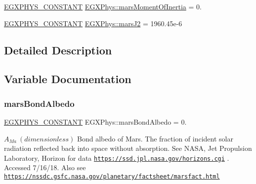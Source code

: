 \begin{DoxyCompactItemize}
\mbox{\hyperlink{group___e_g_x_phys-_constants-_macros_ga76980d288494ce1714c9ac68a95ba702}{E\+G\+X\+P\+H\+Y\+S\+\_\+\+C\+O\+N\+S\+T\+A\+NT}} \mbox{\hyperlink{group___e_g_x_phys-_constants-_astrophysics-_solar_system-_mars-_bulk_ga0401a539ddc5ee19e1b9d031a2257b98}{E\+G\+X\+Phys\+::mars\+Moment\+Of\+Inertia}} = 0.
\item 
\mbox{\hyperlink{group___e_g_x_phys-_constants-_macros_ga76980d288494ce1714c9ac68a95ba702}{E\+G\+X\+P\+H\+Y\+S\+\_\+\+C\+O\+N\+S\+T\+A\+NT}} \mbox{\hyperlink{group___e_g_x_phys-_constants-_astrophysics-_solar_system-_mars-_bulk_ga28d6e310ea5b1ef018ad79d49a95350f}{E\+G\+X\+Phys\+::mars\+J2}} = 1960.\+45e-\/6
\end{DoxyCompactItemize}


\subsection{Detailed Description}


\subsection{Variable Documentation}
\mbox{\label{group___e_g_x_phys-_constants-_astrophysics-_solar_system-_mars-_bulk_ga9e8ddb7e6501c2426bc750822807259c}} 
\subsubsection{\texorpdfstring{mars\+Bond\+Albedo}{marsBondAlbedo}}
{\footnotesize\ttfamily \mbox{\hyperlink{group___e_g_x_phys-_constants-_macros_ga76980d288494ce1714c9ac68a95ba702}{E\+G\+X\+P\+H\+Y\+S\+\_\+\+C\+O\+N\+S\+T\+A\+NT}} E\+G\+X\+Phys\+::mars\+Bond\+Albedo = 0.}

$ A_{Ma} \ (dimensionless)$ Bond albedo of Mars. The fraction of incident solar radiation reflected back into space without absorption. See N\+A\+SA, Jet Propulsion Laboratory, Horizon for data \href{https://ssd.jpl.nasa.gov/horizons.cgi}{\tt https\+://ssd.\+jpl.\+nasa.\+gov/horizons.\+cgi} . Accessed 7/16/18. Also see \href{https://nssdc.gsfc.nasa.gov/planetary/factsheet/marsfact.html}{\tt https\+://nssdc.\+gsfc.\+nasa.\+gov/planetary/factsheet/marsfact.\+html} \mbox{\label{group___e_g_x_phys-_constants-_astrophysics-_solar_system-_mars-_bulk_ga6871edfd0369c53e4d01b0cef426f095}} 
